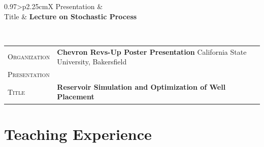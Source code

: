 \documentclass[a4paper, oneside, final]{scrartcl} %
\newcommand{\gray}{\rowcolor[gray]{.90}} %
\begin{document}
\begin{center}
\begin{tabularx}{0.97\linewidth}{>{\raggedleft\scshape}p{2.25cm}X}
			\gray Presentation &\\
			\gray Title & \textbf{Lecture on Stochastic Process}\\
		\end{tabularx}\\
		\vspace*{2pt}
		\begin{tabularx}{0.97\linewidth}{>{\raggedleft\scshape}p{2.25cm}X}
			\gray Organization & \textbf{Chevron Revs-Up Poster Presentation} \hfill California State University, Bakersfield\\
			\gray Presentation &\\
			\gray Title & \textbf{Reservoir Simulation and Optimization of Well Placement}\\
		\end{tabularx}
		\section{Teaching Experience}
		

\end{center}
\end{document}
